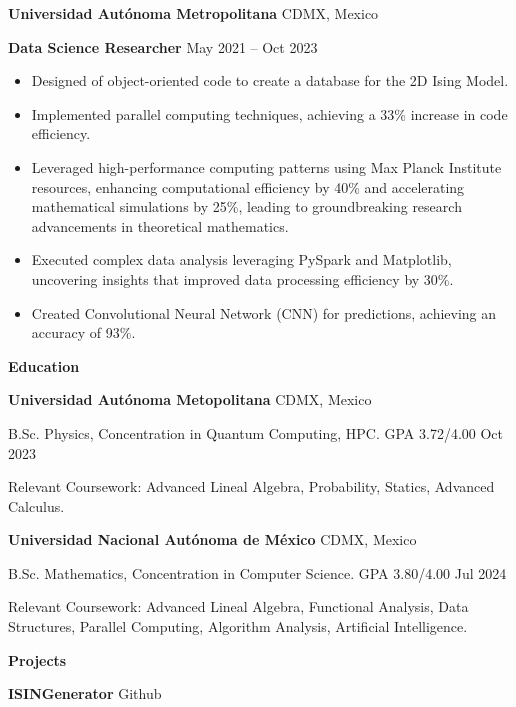 \documentclass[6pt]{article}
\begin{document}
\vspace{12pt}

\textbf{Universidad Autónoma Metropolitana} \hfill CDMX, Mexico

\textbf{Data Science Researcher} \hfill May 2021 – Oct 2023
\begin{itemize}[noitemsep, topsep=0pt, partopsep=0pt, parsep=0pt]
    \item Designed of object-oriented code to create a database for the 2D Ising Model.
    \item Implemented parallel computing techniques, achieving a 33\% increase in code efficiency.
    \item Leveraged high-performance computing patterns using Max Planck Institute resources, enhancing computational efficiency by 40\% and accelerating mathematical simulations by 25\%, leading to groundbreaking research advancements in theoretical mathematics.
    \item Executed complex data analysis leveraging PySpark and Matplotlib, uncovering insights that improved data processing efficiency by 30\%.
    \item Created Convolutional Neural Network (CNN) for predictions, achieving an accuracy of 93\%.
\end{itemize}

\begin{center}
    \textbf{Education}
\end{center}
\textbf{Universidad Autónoma Metopolitana} \hfill CDMX, Mexico

B.Sc. Physics, Concentration in Quantum Computing, HPC. GPA 3.72/4.00 \hfill Oct 2023

Relevant Coursework: Advanced Lineal Algebra, Probability, Statics, Advanced Calculus.

\vspace{12pt}

\textbf{Universidad Nacional Autónoma de México} \hfill CDMX, Mexico

B.Sc. Mathematics, Concentration in Computer Science. GPA 3.80/4.00 \hfill Jul 2024

Relevant Coursework: Advanced Lineal Algebra, Functional Analysis, Data Structures, Parallel Computing, Algorithm Analysis, Artificial Intelligence.

\vspace{12pt}
\begin{center}
    \textbf{Projects}
\end{center}
\textbf{ISINGenerator} \hfill Github
\end{document}
